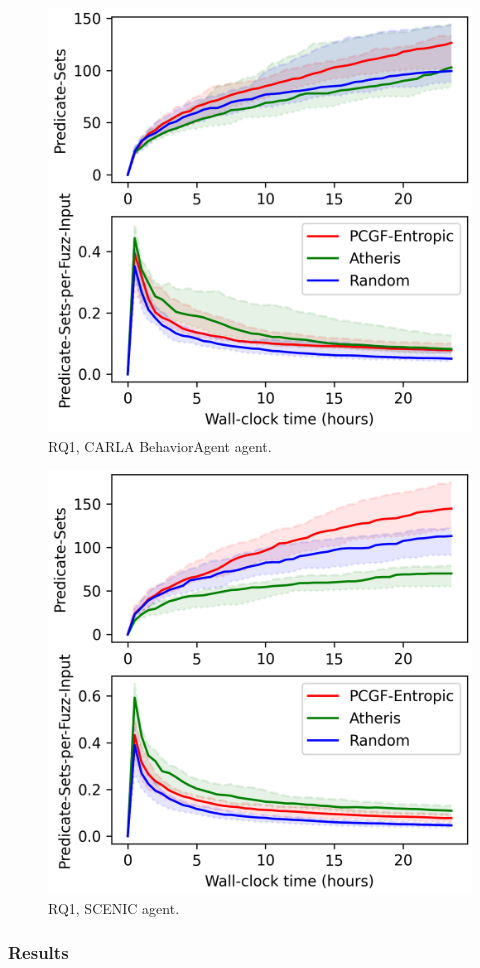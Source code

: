 \begin{figure}
    \centering
    \includegraphics[width=0.6\linewidth]{figures/chapter5/RQ1/(PCGF-Entropic,Atheris,Random)_BehaviorAgent_all-coverage_(Predicate-Sets,Predicate-Sets-per-Fuzz-Input).png}
    \caption{RQ1, CARLA BehaviorAgent agent.}
    \label{fig:RQ1-BehaviorAgent}
\end{figure}

\begin{figure}
    \centering
    \includegraphics[width=0.6\linewidth]{figures/chapter5/RQ1/(PCGF-Entropic,Atheris,Random)_intersectionAgent_all-coverage_(Predicate-Sets,Predicate-Sets-per-Fuzz-Input).png}
    \caption{RQ1, SCENIC agent.}
    \label{fig:RQ1-SCENIC}
\end{figure}




\subsubsection{Results}

